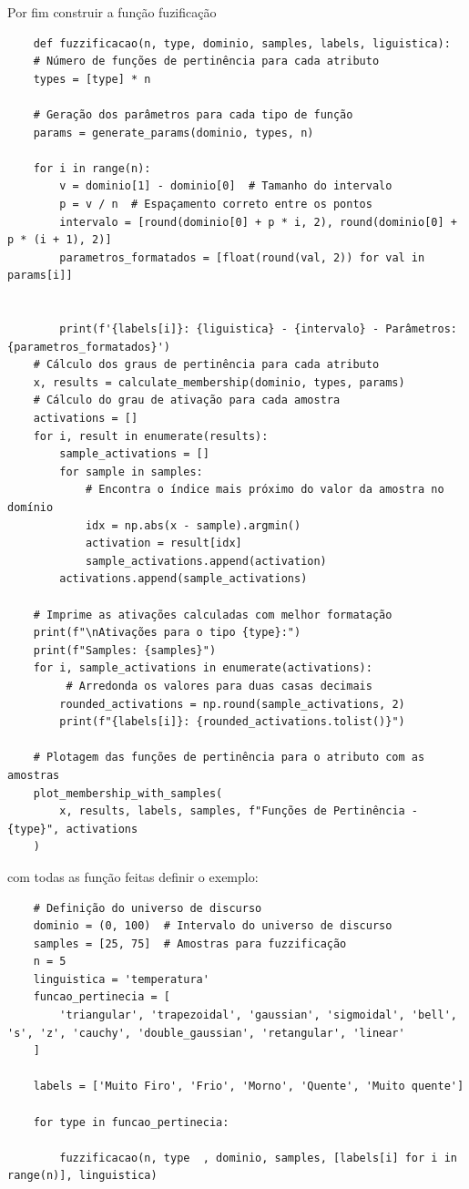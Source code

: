 \documentclass[a4paper,12pt]{article}
\begin{document}
Por fim construir a função fuzificação 
\begin{verbatim}
    def fuzzificacao(n, type, dominio, samples, labels, liguistica):
    # Número de funções de pertinência para cada atributo
    types = [type] * n

    # Geração dos parâmetros para cada tipo de função
    params = generate_params(dominio, types, n)

    for i in range(n):
        v = dominio[1] - dominio[0]  # Tamanho do intervalo
        p = v / n  # Espaçamento correto entre os pontos
        intervalo = [round(dominio[0] + p * i, 2), round(dominio[0] + p * (i + 1), 2)]
        parametros_formatados = [float(round(val, 2)) for val in params[i]]


        print(f'{labels[i]}: {liguistica} - {intervalo} - Parâmetros: {parametros_formatados}')
    # Cálculo dos graus de pertinência para cada atributo
    x, results = calculate_membership(dominio, types, params)
    # Cálculo do grau de ativação para cada amostra
    activations = []
    for i, result in enumerate(results):
        sample_activations = []
        for sample in samples:
            # Encontra o índice mais próximo do valor da amostra no domínio
            idx = np.abs(x - sample).argmin()
            activation = result[idx]
            sample_activations.append(activation)
        activations.append(sample_activations)

    # Imprime as ativações calculadas com melhor formatação
    print(f"\nAtivações para o tipo {type}:")
    print(f"Samples: {samples}")
    for i, sample_activations in enumerate(activations):
         # Arredonda os valores para duas casas decimais
        rounded_activations = np.round(sample_activations, 2)
        print(f"{labels[i]}: {rounded_activations.tolist()}")

    # Plotagem das funções de pertinência para o atributo com as amostras
    plot_membership_with_samples(
        x, results, labels, samples, f"Funções de Pertinência - {type}", activations
    )

\end{verbatim}

com todas as função feitas definir o exemplo: 

\begin{verbatim}
    # Definição do universo de discurso
    dominio = (0, 100)  # Intervalo do universo de discurso
    samples = [25, 75]  # Amostras para fuzzificação
    n = 5
    linguistica = 'temperatura'
    funcao_pertinecia = [
        'triangular', 'trapezoidal', 'gaussian', 'sigmoidal', 'bell', 's', 'z', 'cauchy', 'double_gaussian', 'retangular', 'linear'
    ]
    
    labels = ['Muito Firo', 'Frio', 'Morno', 'Quente', 'Muito quente']
    
    for type in funcao_pertinecia:
        
        fuzzificacao(n, type  , dominio, samples, [labels[i] for i in range(n)], linguistica)
    
    
\end{verbatim}
\end{document}
